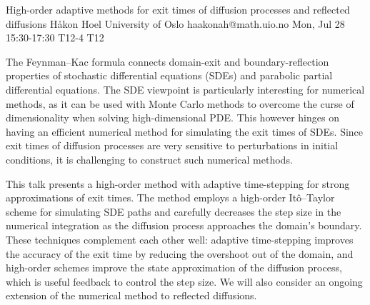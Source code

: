 \begin{talk}
  {High-order adaptive methods for exit times of diffusion processes and reflected diffusions}%
  {H{\aa}kon Hoel}%
  {University of Oslo}%
  {haakonah@math.uio.no}%
  {}%
  {}%
  {Mon, Jul 28 15:30-17:30}%
  {T12-4}%
  {T12}%
  {}%
  
				
			
\medskip
The Feynman--Kac formula connects domain-exit and boundary-reflection properties of stochastic differential equations (SDEs) and parabolic partial differential equations. The SDE viewpoint is particularly interesting for numerical methods, as it can be used with Monte Carlo methods to overcome the curse of dimensionality when solving high-dimensional PDE. This however hinges on having an efficient numerical method for simulating the exit times of SDEs. Since exit times of diffusion processes are very sensitive to perturbations in initial conditions, it is challenging to construct such numerical methods.

This talk presents a high-order method with adaptive time-stepping for strong approximations of exit times. The method employs a high-order Itô--Taylor scheme for simulating SDE paths and carefully decreases the step size in the numerical integration as the diffusion process approaches the domain's boundary. These techniques complement each other well: adaptive time-stepping improves the accuracy of the exit time by reducing the overshoot out of the domain, and high-order schemes improve the state approximation of the diffusion process, which is useful feedback to control the step size. We will also consider an ongoing extension of the numerical method to reflected diffusions.

\end{talk}

